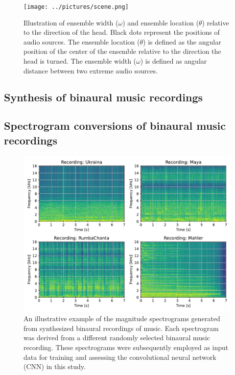 \documentclass{article}
\begin{document}
\begin{figure}[ht]
  \centering
  \texttt{[image: ../pictures/scene.png]}
  \caption{\label{fig:scene}Illustration of ensemble width ($\omega$) and ensemble location ($\theta$) relative to the direction of the head. Black dots represent the positions of audio sources. The ensemble location ($\theta$) is defined as the angular position of the center of the ensemble relative to the direction the head is turned. The ensemble width ($\omega$) is defined as angular distance between two extreme audio sources. }
\end{figure}

\subsection{Synthesis of binaural music recordings}

\subsection{Spectrogram conversions of binaural music recordings}

\begin{figure}
  \centering
  \includegraphics[width=\linewidth]{../figures/samples.pdf}
  \caption{\label{fig:samples}An illustrative example of the magnitude spectrograms generated from synthesized binaural recordings of music. Each spectrogram was derived from a different randomly selected binaural music recording. These spectrograms were subsequently employed as input data for training and assessing the convolutional neural network (CNN) in this study. }
\end{figure}
\end{document}

